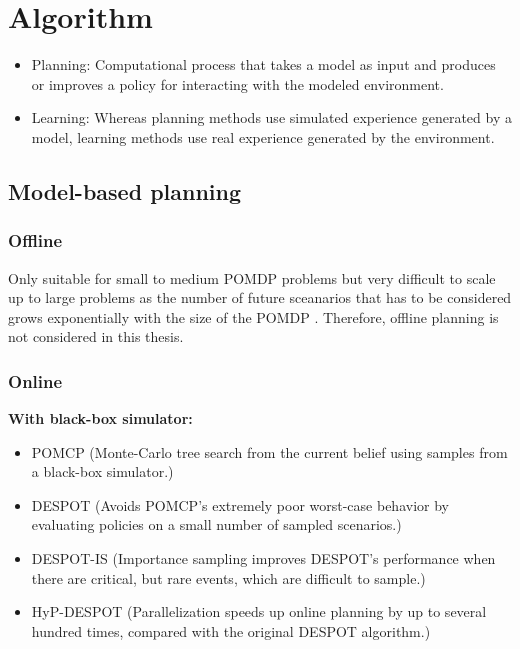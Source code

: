 \chapter*{Algorithm}
\label{sec:algorithm}




\begin{itemize}
    \item Planning: Computational process that takes a model as input and produces or improves a policy for interacting with the modeled environment.
    \item Learning: Whereas planning methods use simulated experience generated by a model, learning methods use real experience generated by the environment.
\end{itemize}

\section{Model-based planning}

\subsection{Offline}

Only suitable for small to medium POMDP problems but very difficult to scale up to large problems as the number of future sceanarios that has to be considered grows exponentially with the size of the POMDP \parencite{despot}. Therefore, offline planning is not considered in this thesis. 

\subsection{Online}

\textbf{With black-box simulator:}
\begin{itemize}
    \item POMCP (Monte-Carlo tree search from the current belief using samples from a black-box simulator.)
    \item DESPOT (Avoids POMCP’s extremely poor worst-case behavior by evaluating policies on a small number of sampled scenarios.)
    \item DESPOT-IS (Importance sampling improves DESPOT’s performance when there are critical, but rare events, which are difficult to sample.)
    \item HyP-DESPOT (Parallelization speeds up online planning by up to several hundred times, compared with the original DESPOT algorithm.)
\end{itemize}

